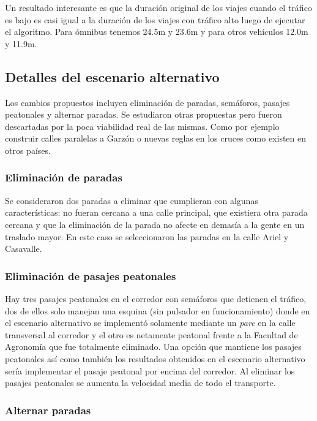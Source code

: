 Un resultado interesante es que la duración original de los viajes cuando el tráfico es bajo es casi igual a la duración de los viajes con tráfico alto luego de ejecutar el algoritmo.
Para ómnibus tenemos 24.5m y 23.6m y  para otros vehículos 12.0m y 11.9m.

\subsection{Detalles del escenario alternativo}
Los cambios propuestos incluyen eliminación de paradas, semáforos, pasajes peatonales y alternar paradas. Se estudiaron otras propuestas pero fueron descartadas por la poca viabilidad real de las mismas. Como por ejemplo construir calles paralelas a Garzón o nuevas reglas en los cruces como existen en otros países.




\subsubsection{Eliminación de paradas}
Se consideraron dos paradas a eliminar que cumplieran con algunas características: no fueran cercana a una calle principal, que existiera otra parada cercana y que la eliminación de la parada no afecte en demasía a la gente en un traslado mayor.
En este caso se seleccionaron las paradas en la calle Ariel y Casavalle.



\subsubsection{Eliminación de pasajes peatonales}
Hay tres pasajes peatonales en el corredor con semáforos que detienen el tráfico, dos de ellos solo manejan una esquina (sin pulsador en funcionamiento) donde en el escenario alternativo se implementó solamente mediante un \emph{pare} en la calle transversal al corredor y el otro es netamente peatonal frente a la Facultad de Agronomía que fue totalmente eliminado. Una opción que mantiene los pasajes peatonales así como también los resultados obtenidos en el escenario alternativo sería implementar el pasaje peatonal por encima del corredor. Al eliminar los pasajes peatonales se aumenta la velocidad media de todo el transporte.

\subsubsection{Alternar paradas}

